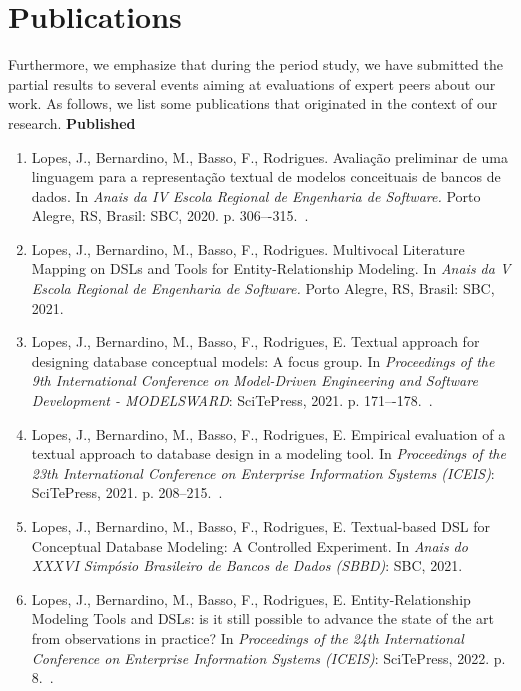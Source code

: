 \section{Publications}

Furthermore, we emphasize that during the period study, we have submitted the partial results to several events aiming at evaluations of expert peers about our work.
As follows, we list some publications that originated in the context of our research.
\linebreak 
\linebreak
\textbf{Published} 
    \begin{enumerate}[label=\roman*.]
        \item Lopes, J., Bernardino, M., Basso, F., Rodrigues. Avaliação preliminar de uma linguagem para a representação textual de modelos conceituais de bancos de dados. In \textit{Anais da IV Escola Regional de Engenharia de Software.} Porto Alegre, RS, Brasil: SBC, 2020. p. 306–-315.~\cite{eres}. 
        \item Lopes, J., Bernardino, M., Basso, F., Rodrigues. Multivocal Literature Mapping on DSLs and Tools for Entity-Relationship Modeling. In \textit{Anais da V Escola Regional de Engenharia de Software.} Porto Alegre, RS, Brasil: SBC, 2021.~\cite{eres:2021}
        \item Lopes, J., Bernardino, M., Basso, F., Rodrigues, E. Textual approach for designing database conceptual models: A focus group. In \textit{Proceedings of the 9th International Conference on Model-Driven Engineering and Software Development - MODELSWARD}: SciTePress, 2021. p. 171–-178.~\cite{modelsward21}. 
        \item Lopes, J., Bernardino, M., Basso, F., Rodrigues, E. Empirical evaluation of a textual approach to database design in a modeling tool. In \textit{Proceedings of the 23th International Conference on Enterprise Information Systems (ICEIS)}: SciTePress, 2021. p. 208--215.~\cite{iceis21}. 
        \item Lopes, J., Bernardino, M., Basso, F., Rodrigues, E. Textual-based DSL for Conceptual Database Modeling: A Controlled Experiment. In \textit{Anais do XXXVI Simpósio Brasileiro de Bancos de Dados (SBBD)}: SBC, 2021.~\cite{sbbd:2021}
        \item Lopes, J., Bernardino, M., Basso, F., Rodrigues, E. Entity-Relationship Modeling Tools and DSLs: is it still possible to advance the state of the art from observations in practice? In \textit{Proceedings of the 24th International Conference on Enterprise Information Systems (ICEIS)}: SciTePress, 2022. p. 8.~\cite{iceis:2022}.
    \end{enumerate} 

